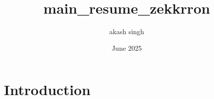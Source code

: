 \documentclass{article}
\title{main_resume_zekkrron}
\author{akash singh}
\date{June 2025}
\begin{document}
\maketitle

\section{Introduction}
\end{document}
